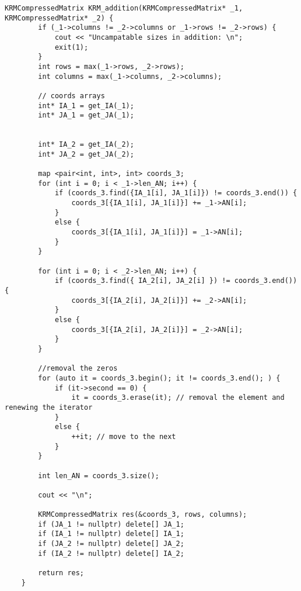 \begin{lstlisting}[label = list8, caption = Программная реализация алгоритма сложения мартиц сажтаых по схеме Рейнбольдта-Местеньи]
	KRMCompressedMatrix KRM_addition(KRMCompressedMatrix* _1, KRMCompressedMatrix* _2) {
		if (_1->columns != _2->columns or _1->rows != _2->rows) {
			cout << "Uncampatable sizes in addition: \n";
			exit(1);
		}
		int rows = max(_1->rows, _2->rows);
		int columns = max(_1->columns, _2->columns);
		
		// coords arrays
		int* IA_1 = get_IA(_1);
		int* JA_1 = get_JA(_1);
		
		
		int* IA_2 = get_IA(_2);
		int* JA_2 = get_JA(_2);
		
		map <pair<int, int>, int> coords_3;
		for (int i = 0; i < _1->len_AN; i++) {
			if (coords_3.find({IA_1[i], JA_1[i]}) != coords_3.end()) {
				coords_3[{IA_1[i], JA_1[i]}] += _1->AN[i];
			}
			else {
				coords_3[{IA_1[i], JA_1[i]}] = _1->AN[i]; 
			}
		}
		
		for (int i = 0; i < _2->len_AN; i++) {
			if (coords_3.find({ IA_2[i], JA_2[i] }) != coords_3.end()) {
				coords_3[{IA_2[i], JA_2[i]}] += _2->AN[i];
			}
			else {
				coords_3[{IA_2[i], JA_2[i]}] = _2->AN[i];
			}
		}
		
		//removal the zeros
		for (auto it = coords_3.begin(); it != coords_3.end(); ) {
			if (it->second == 0) {
				it = coords_3.erase(it); // removal the element and renewing the iterator
			}
			else {
				++it; // move to the next
			}
		}
		
		int len_AN = coords_3.size();
		
		cout << "\n";
		
		KRMCompressedMatrix res(&coords_3, rows, columns);
		if (JA_1 != nullptr) delete[] JA_1;
		if (IA_1 != nullptr) delete[] IA_1;
		if (JA_2 != nullptr) delete[] JA_2;
		if (IA_2 != nullptr) delete[] IA_2;
		
		return res;
	}
\end{lstlisting}

